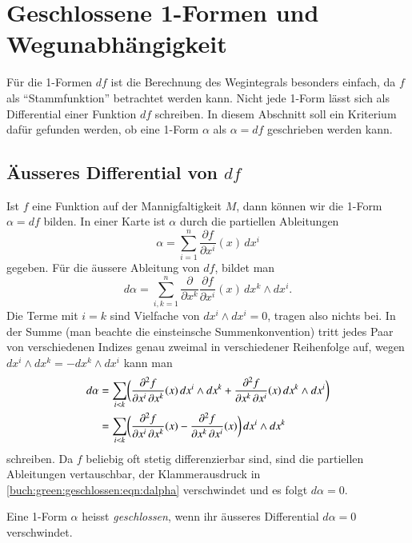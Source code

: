 %
%
\section{Geschlossene 1-Formen und Wegunabhängigkeit
\label{buch:green:section:geschlossen}}
%
Für die 1-Formen $df$ ist die Berechnung des Wegintegrals besonders
einfach, da $f$ als ``Stammfunktion'' betrachtet werden kann.
Nicht jede 1-Form lässt sich als Differential einer Funktion $df$ 
schreiben.
In diesem Abschnitt soll ein Kriterium dafür gefunden werden, 
ob eine 1-Form $\alpha$ als $\alpha=df$ geschrieben werden kann.

%
%
\subsection{Äusseres Differential von $df$}
Ist $f$ eine Funktion auf der Mannigfaltigkeit $M$, dann können wir
die 1-Form $\alpha = df$ bilden.
In einer Karte ist $\alpha$ durch die partiellen Ableitungen
\[
\alpha
=
\sum_{i=1}^n
\frac{\partial f}{\partial x^i}(x)\,dx^i
\]
gegeben.
Für die äussere Ableitung von $df$, bildet man
\[
d\alpha
=
\sum_{i,k=1}^n
\frac{\partial}{\partial x^k}
\frac{\partial f}{\partial x^i}(x)\,
dx^k
\wedge
dx^i.
\]
Die Terme mit $i=k$ sind Vielfache von $dx^i\wedge dx^i=0$, tragen
also nichts bei.
In der Summe (man beachte die einsteinsche Summenkonvention)
tritt jedes Paar von verschiedenen Indizes genau zweimal in verschiedener
Reihenfolge auf, wegen $dx^i\wedge dx^k = - dx^k \wedge dx^i$ kann man
\begin{align}
d\alpha
&=
\sum_{i < k}
\biggl(
\frac{\partial^2 f}{\partial x^i\,\partial x^k}(x)\, dx^i\wedge dx^k
+
\frac{\partial^2 f}{\partial x^k\,\partial x^i}(x)\, dx^k\wedge dx^i
\biggr)
\notag
\\
&=
\sum_{i < k}
\biggl(
\frac{\partial^2 f}{\partial x^i\,\partial x^k}(x)
-
\frac{\partial^2 f}{\partial x^k\,\partial x^i}(x)
\biggr)
\, dx^i\wedge dx^k
\label{buch:green:geschlossen:eqn:dalpha}
\end{align}
schreiben.
Da $f$ beliebig oft stetig differenzierbar sind, sind die partiellen
Ableitungen vertauschbar, der Klammerausdruck in
\eqref{buch:green:geschlossen:eqn:dalpha}
verschwindet und es folgt $d\alpha = 0$.

\begin{definition}
%
Eine 1-Form $\alpha$ heisst {\em geschlossen}, wenn ihr äusseres
Differential $d\alpha=0$ verschwindet.
\end{definition}

